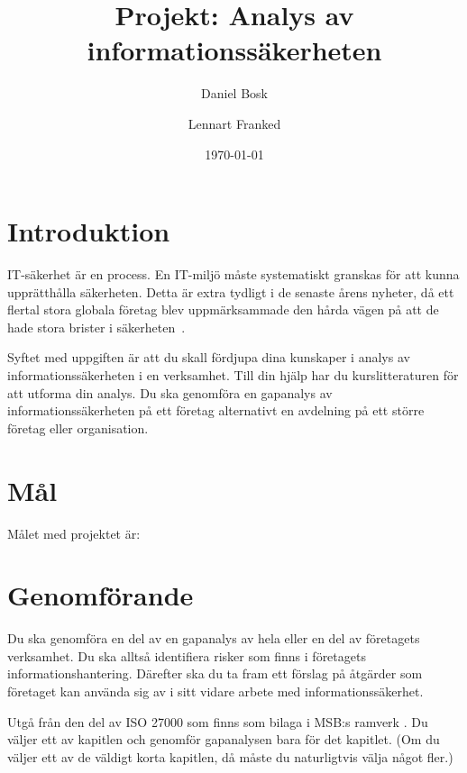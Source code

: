 \documentclass[a4paper]{article}
\begin{document}
\title{Projekt: Analys av informationssäkerheten}
\author{Daniel Bosk}
\author{Lennart Franked}
\date{\today}

\maketitle

\section{Introduktion}

IT-säkerhet är en process.
En IT-miljö måste systematiskt granskas för att kunna upprätthålla säkerheten.
Detta är extra tydligt i de senaste årens nyheter, då ett flertal stora globala 
företag blev uppmärksammade den hårda vägen på att de hade stora brister 
i säkerheten~\cite[se][]{Fisher2011rsa,Hunt2011abs,Cluley2012twp,%
  Oberheide2010bao,Cubrilovic2009rhf,%
  Jones2013targethack,Ducklin2014targethack,Zetter2014targethack%
}.

Syftet med uppgiften är att du skall fördjupa dina kunskaper i analys av 
informationssäkerheten i en verksamhet.
Till din hjälp har du kurslitteraturen för att utforma din analys.
Du ska genomföra en gapanalys av informationssäkerheten på ett företag 
alternativt en avdelning på ett större företag eller organisation.


\section{Mål}

Målet med projektet är:
\begin{itemize}
	
\end{itemize}


\section{Genomförande}
\noindent
Du ska genomföra en del av en gapanalys av hela eller en del av företagets 
verksamhet.
Du ska alltså identifiera risker som finns i företagets informationshantering.
Därefter ska du ta fram ett förslag på åtgärder som företaget kan använda sig 
av i sitt vidare arbete med informationssäkerhet.

Utgå från den del av ISO 27000 som finns som bilaga i MSB:s ramverk 
\cite{MSB2011gb}.
Du väljer ett av kapitlen och genomför gapanalysen bara för det kapitlet.
(Om du väljer ett av de väldigt korta kapitlen, då måste du naturligtvis välja 
något fler.)
\end{document}
